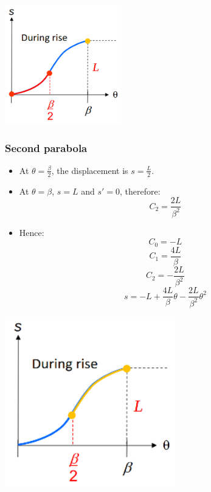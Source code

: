 \documentclass[11pt]{article}
\begin{document}
\begin{center}
\includegraphics[height=14em]{./images/parabolic-motion-first-parabola-graph.png}
\end{center}
\subsubsection{Second parabola}
\label{sec:orga39387f}
\begin{itemize}
\item At \(\theta = \frac{\beta}{2}\), the displacement is \(s = \frac{L}{2}\).
\item At \(\theta = \beta\), \(s = L\) and \(s' = 0\), therefore:
\[C_2 = \frac{2L}{\beta^2}\]
\item Hence:
\[C_0 = -L\]
\[C_1 = \frac{4L}{\beta}\]
\[C_2 = -\frac{2L}{\beta^2}\]
\[s = -L + \frac{4L}{\beta} \theta - \frac{2L}{\beta^2} \theta^2\]
\end{itemize}

\begin{center}
\includegraphics[height=20em]{./images/parabolic-motion-second-parabola-graph.png}
\end{center}
\end{document}
